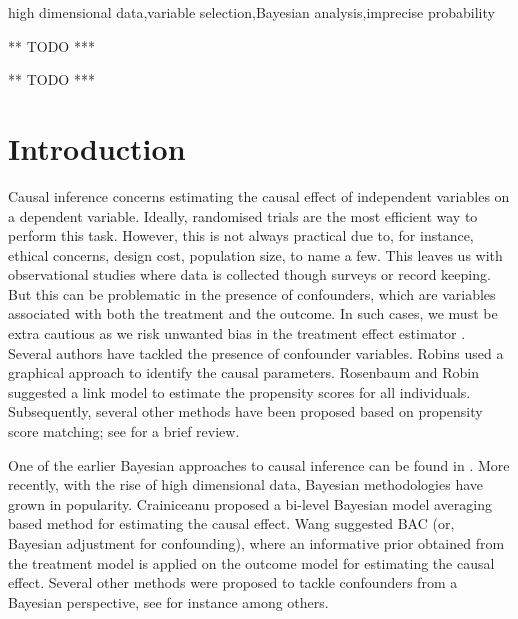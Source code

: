 \documentclass[preprint,12pt]{elsarticle}
\begin{document}
\begin{frontmatter}
\begin{keyword}
  high dimensional data\sep variable selection\sep Bayesian analysis\sep imprecise probability
\end{keyword}

\begin{highlights}
\item *** TODO ***
\item *** TODO ***
\end{highlights}

\end{frontmatter}

\section{Introduction}\label{sec:intro}

Causal inference concerns estimating the causal
effect of independent variables on a dependent variable. Ideally,
randomised trials are the most efficient way to perform this task.
However, this is not always practical due to, for instance, ethical 
concerns, design cost, population size, to name a few. This
leaves us with observational studies
where data is collected though surveys or record keeping. But this
can be problematic in the presence of confounders, which are variables associated with both the treatment and the outcome.
In such cases, we must be extra cautious as we risk
unwanted bias in the treatment effect estimator \cite{rosenbaum83}.
Several authors have tackled the presence of
confounder variables. 
Robins \cite{Robins1986ANA} used a graphical
approach to identify the causal parameters.
Rosenbaum and Robin \cite{rosenbaum1985} suggested a link model to estimate
the propensity scores for all individuals. Subsequently, several other
methods have been proposed based on propensity score matching;
see \cite{winship99,stuart10} for a brief review.

One of the earlier Bayesian approaches to causal inference
can be found in \cite{rubin1978}. More recently,
with the rise of high dimensional data,
Bayesian methodologies have grown in popularity.
Crainiceanu \cite{Crainiceanu2008} proposed a bi-level 
Bayesian model averaging based method for estimating the causal 
effect. Wang \cite{wang2015} suggested BAC (or, Bayesian adjustment for
confounding),
where an informative prior obtained from
the treatment model is applied on the outcome model for
estimating the causal effect. Several other methods were
proposed to tackle confounders from a Bayesian perspective,
see for instance \cite{Zigler2014,Hahn2018} among others.
\end{document}
